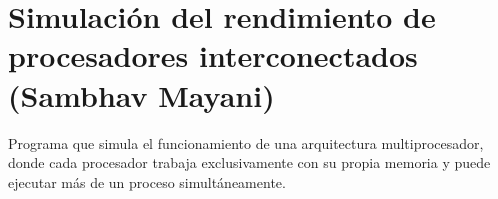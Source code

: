 \chapter{Simulación del rendimiento de procesadores interconectados (Sambhav Mayani)}
\hypertarget{index}{}\label{index}
Programa que simula el funcionamiento de una arquitectura multiprocesador, donde cada procesador trabaja exclusivamente con su propia memoria y puede ejecutar más de un proceso simultáneamente. 